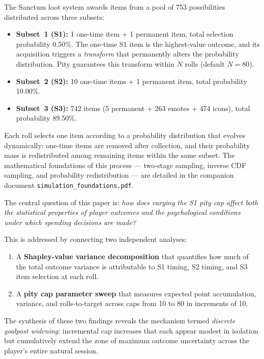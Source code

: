 \documentclass[11pt, a4paper]{article}
\begin{document}
The Sanctum loot system awards items from a pool of 753 possibilities
distributed across three subsets:
\begin{itemize}[nosep]
    \item \textbf{Subset~1 (S1):} 1 one-time item + 1 permanent item,
          total selection probability 0.50\%. The one-time S1 item is
          the highest-value outcome, and its acquisition triggers a
          \emph{transform} that permanently alters the probability
          distribution. Pity guarantees this transform within $N$ rolls
          (default $N = 80$).
    \item \textbf{Subset~2 (S2):} 10 one-time items + 1 permanent item,
          total probability 10.00\%.
    \item \textbf{Subset~3 (S3):} 742 items (5 permanent + 263 emotes +
          474 icons), total probability 89.50\%.
\end{itemize}

Each roll selects one item according to a probability distribution
that evolves dynamically: one-time items are removed after collection,
and their probability mass is redistributed among remaining items
within the same subset. The mathematical foundations of this process
--- two-stage sampling, inverse CDF sampling, and probability
redistribution --- are detailed in the companion document
\texttt{simulation\_foundations.pdf}.

The central question of this paper is: \emph{how does varying the S1
pity cap affect both the statistical properties of player outcomes
and the psychological conditions under which spending decisions are
made?}

This is addressed by connecting two independent analyses:
\begin{enumerate}[nosep]
    \item A \textbf{Shapley-value variance decomposition} that
          quantifies how much of the total outcome variance is
          attributable to S1 timing, S2 timing, and S3 item selection
          at each roll.
    \item A \textbf{pity cap parameter sweep} that measures expected
          point accumulation, variance, and rolls-to-target across
          caps from 10 to 80 in increments of 10.
\end{enumerate}

The synthesis of these two findings reveals the mechanism termed
\emph{discrete goalpost widening}: incremental cap increases that
each appear modest in isolation but cumulatively extend the zone of
maximum outcome uncertainty across the player's entire natural session.
\end{document}
